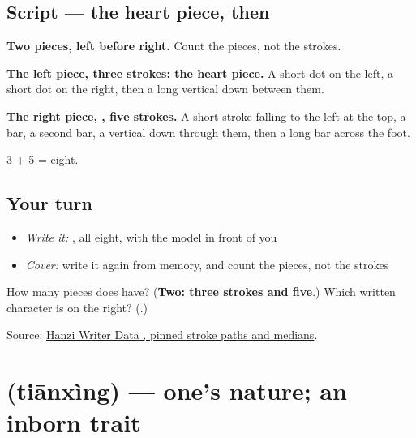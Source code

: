 \subsection*{Script — the heart piece, then }

\begin{quote}
\end{quote}

\textbf{Two pieces, left before right.} Count the pieces, not the strokes.

\textbf{The left piece, three strokes: the heart piece.} A short dot on the left, a short dot on the right, then a long vertical down between them.

\textbf{The right piece, , five strokes.} A short stroke falling to the left at the top, a bar, a second bar, a vertical down through them, then a long bar across the foot.

3 + 5 = eight.

\subsection*{Your turn}
\begin{itemize}
\raggedright
  \item \emph{Write it:} , all eight, with the model in front of you
  \item \emph{Cover:} write it again from memory, and count the pieces, not the strokes
\end{itemize}

\begin{tcolorbox}[breakable,colback=teal!4,colframe=teal!35!black,title={Before you move on}]
How many pieces does  have? (\textbf{Two: three strokes and five}.) Which written character is on the right? (\textbf{}.)

Source: \href{https://raw.githubusercontent.com/chanind/hanzi-writer-data/68d10a4b21150cae5e1ebbd223eed289cf32d90c/data/\%E6\%80\%A7.json}{Hanzi Writer Data , pinned stroke paths and medians}.
\end{tcolorbox}
\section[\texorpdfstring{\zh{天性} (tiānxìng)}{天性 (tiānxìng)}]{ (tiānxìng) — one's nature; an inborn trait}

\label{lesson:ZH-C467-tianxing}



